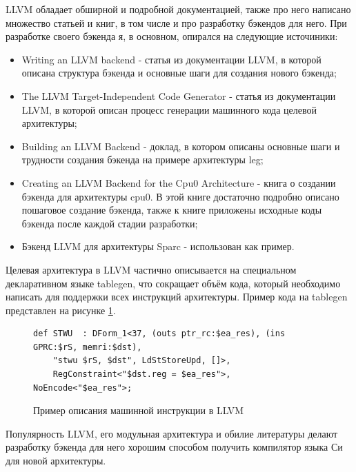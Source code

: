 \documentclass[a4paper,14pt]{extarticle}
\begin{document}
LLVM обладает обширной и подробной документацией, также про него написано множество статьей и книг, в том числе и про разработку бэкендов для него. При разработке своего бэкенда я, в основном, опирался на следующие источиники:
\begin{itemize}
	\item Writing an LLVM backend\cite{llvm:writing_backend} - статья из документации LLVM, в которой описана структура бэкенда и основные шаги для создания нового бэкенда;
	\item The LLVM Target-Independent Code Generator\cite{llvm:codegen} - статья из документации LLVM, в которой описан процесс генерации машинного кода целевой архитектуры;
	\item Building an LLVM Backend\cite{llvmleg} - доклад, в котором описаны основные шаги и трудности создания бэкенда на примере архитектуры leg;
	\item Creating an LLVM Backend for the Cpu0 Architecture\cite{cpu0} - книга о создании бэкенда для архитектуры cpu0. В этой книге достаточно подробно описано пошаговое создание бэкенда, также к книге приложены исходные коды бэкенда после каждой стадии разработки;
	\item Бэкенд LLVM для архитектуры Sparc\cite{llvm:sparc} - использован как пример.
\end{itemize}

Целевая архитектура в LLVM частично описывается на специальном декларативном языке tablegen, что сокращает объём кода, который необходимо написать для поддержки всех инструкций архитектуры\cite{llvm:codegen}. Пример кода на tablegen представлен на рисунке \ref{tablegen-example}.
\begin{figure}[h!]
	\begin{verbatim}
def STWU  : DForm_1<37, (outs ptr_rc:$ea_res), (ins GPRC:$rS, memri:$dst),
	"stwu $rS, $dst", LdStStoreUpd, []>,
	RegConstraint<"$dst.reg = $ea_res">, NoEncode<"$ea_res">;
	\end{verbatim}
	\caption{Пример описания машинной инструкции в LLVM\cite{llvm:codegen}}
	\label{tablegen-example}
\end{figure}

Популярность  LLVM, его модульная архитектура и обилие литературы делают разработку бэкенда для него хорошим способом получить компилятор языка Си для новой архитектуры.
\end{document}
